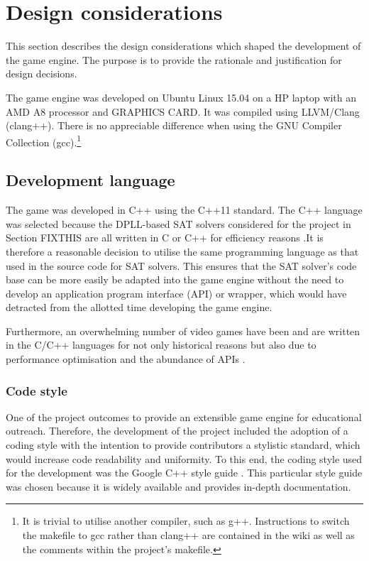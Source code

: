 \documentclass[11pt, a4paper, oneside]{report} %
\begin{document}
\section{Design considerations}

This section describes the design considerations which shaped the development of
the game engine. The purpose is to provide the rationale and justification for
design decisions. 

The game engine was developed on Ubuntu Linux 15.04 on a HP laptop with an AMD
A8 processor and GRAPHICS CARD. It was compiled using LLVM/Clang (clang++).
There is no appreciable difference when using the GNU Compiler Collection
(gcc).\footnote{It is trivial to utilise another compiler, such as g++.
Instructions to switch the makefile to gcc rather than clang++ are contained in
the wiki as well as the comments within the project's makefile.}


\subsection{Development language}

The game was developed in C++ using the C++11 standard. The C++ language was
selected because the DPLL-based SAT solvers considered for the project in
Section FIXTHIS are all written in C or C++ for efficiency reasons
\cite{zhang2002quest}.It is therefore a reasonable decision to utilise the same
programming language as that used in the source code for SAT solvers. This
ensures that the  SAT solver's code base can be more easily be adapted into the
game engine without the need to develop an application program interface (API)
or wrapper, which would have detracted from the allotted time developing the
game engine.

Furthermore, an overwhelming number of video games have been and are written in
the C/C++ languages for not only historical reasons but also due to performance
optimisation and the abundance of APIs \cite{Gregory:2009}.

\subsubsection{Code style}

One of the project outcomes to provide an extensible game engine for educational
outreach. Therefore, the development of the project included the adoption of a
coding style with the intention to provide contributors a stylistic standard,
which would increase code readability and uniformity. To this end, the coding
style used for the development was the Google C++ style guide \cite{googlecpp}.
This particular style guide was chosen because it is widely available and
provides in-depth documentation.
\end{document}
